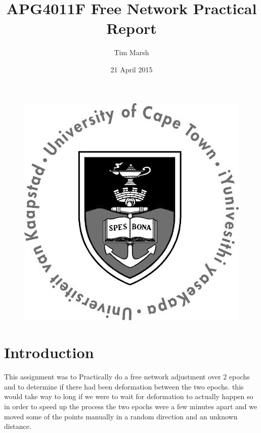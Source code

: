 \documentclass[12pt,a4paper]{article}
\title{APG4011F Free Network Practical Report}
\date{21 April 2015}
\author{Tim Marsh}
\begin{document}
	
	\maketitle
	\begin{figure}[H]
		\centering
		\includegraphics[width=0.7\linewidth]{images/UCTcircular_logo1_CMYK}
		\label{fig:UCTcircular_logo1_CMYK}
	\end{figure}
	\newpage
	\tableofcontents
	\newpage
	
	
	\section{Introduction}
	
	This assignment was to Practically do a free network adjustment over 2 epochs and to determine if there had been deformation between the two epochs. this would take way to long if we were to wait for deformation to actually happen so in order to speed up the process the two epochs were a few minutes apart and we moved some of the points manually in a random direction and an unknown distance.
	
\end{document}
